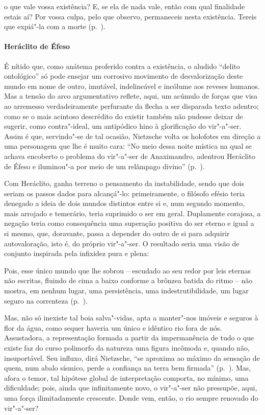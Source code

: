 \begin{hedraquote} 
o que vale vossa existência?
E, se ela de nada vale, então com qual finalidade estais aí? Por vossa
culpa, pelo que observo, permaneceis nesta existência. Tereis que
expiá"-la com a morte (p.~\pageref{oquevale}).
\end{hedraquote} 

\paragraph{Heráclito de Éfeso} É nítido que, como anátema proferido contra a existência, o aludido
``delito ontológico'' só pode ensejar um
corrosivo movimento de desvalorização deste mundo em nome de outro,
imutável, indelineável e incólume aos reveses humanos. Mas a tensão do
arco argumentativo reflete, aqui, um acúmulo de forças que visa ao
arremesso verdadeiramente perfurante da flecha a ser disparada texto
adentro; como se o mais acintoso descrédito do existir também não
pudesse deixar de sugerir, como contra"-ideal, um antipódico hino à
glorificação do vir"-a"-ser. Assim é que, servindo"-se de tal ocasião,
Nietzsche volta os holofotes em direção a uma personagem que lhe é
muito cara: ``No meio dessa noite mística na qual se
achava encoberto o problema do vir"-a"-ser de Anaximandro, adentrou
Heráclito de Éfeso e iluminou"-a por meio de um relâmpago
divino'' (p.~\pageref{noitemistica}).

Com Heráclito, ganha terreno o pensamento da instabilidade, sendo que
dois seriam os passos dados para alcançá"-lo: primeiramente, o filósofo
efésio teria denegado a ideia de dois mundos distintos entre si e, num
segundo momento, mais arrojado e temerário, teria suprimido o ser em
geral. Duplamente corajosa, a negação teria como consequência uma
superação positiva do ser eterno e igual a si mesmo, que, doravante,
passa a depender do outro de si para adquirir autovaloração, isto é, do
próprio vir"-a"-ser. O resultado seria uma visão de conjunto inspirada
pela infixidez pura e plena: 

\begin{hedraquote} 
Pois, esse único mundo que
lhe sobrou -- escudado ao seu redor por leis eternas não escritas,
fluindo de cima a baixo conforme a brônzea batida do ritmo -- não
mostra, em nenhum lugar, uma persistência, uma indestrutibilidade, um
lugar seguro na correnteza (p.~\pageref{esseunicomundo}).
\end{hedraquote} 

Mas, não só inexiste tal boia salva"-vidas, apta a manter"-nos imóveis e
seguros à flor da água, como sequer haveria um único e idêntico rio
fora de nós. Assustadora, a representação formada a partir da
impermanência de tudo o que existe faz do curso polimorfo da natureza
uma figura incômoda e, quando não, insuportável. Seu influxo, dirá
Nietzsche, ``se aproxima ao máximo da sensação de quem,
num abalo sísmico, perde a confiança na terra bem
firmada'' (p.~\pageref{abalosismico}). Mas, afora o
temor, tal hipótese global de interpretação comporta, no mínimo, uma
dificuldade; pois, ainda que infinitamente novo, o vir"-a"-ser não
pressupõe, aqui, uma força ilimitadamente crescente. Donde vem, então,
o rio sempre renovado do vir"-a"-ser? 


